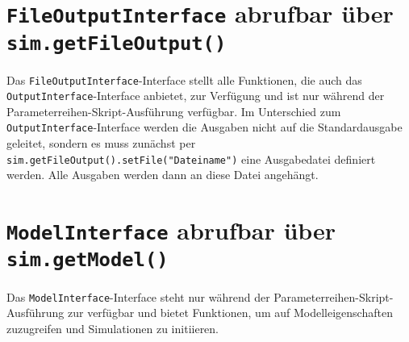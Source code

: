 \chapter{\texttt{FileOutputInterface} abrufbar über \texttt{sim.getFileOutput()}}

Das \texttt{FileOutputInterface}-Interface stellt alle Funktionen, die auch das
\texttt{OutputInterface}-Interface anbietet, zur Verfügung und ist nur während
der Parameterreihen-Skript-Ausführung verfügbar. Im Unterschied
zum \texttt{OutputInterface}-Interface werden die Ausgaben nicht auf die Standardausgabe
geleitet, sondern es muss zunächst per \texttt{sim.getFileOutput().setFile("{}Dateiname")}
eine Ausgabedatei definiert werden. Alle Ausgaben werden dann an diese
Datei angehängt.



\chapter{\texttt{ModelInterface} abrufbar über \texttt{sim.getModel()}}

Das \texttt{ModelInterface}-Interface steht nur während der Parameterreihen-Skript-Ausführung
zur verfügbar und bietet Funktionen, um auf Modelleigenschaften zuzugreifen und
Simulationen zu initiieren.

